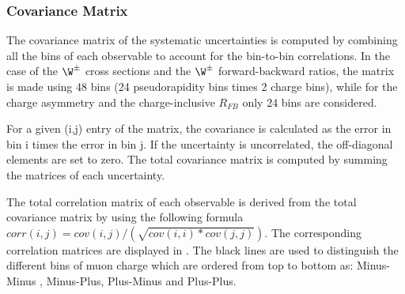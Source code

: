 






\clearpage
\subsubsection{Covariance Matrix}\label{sec:WBoson_Analysis_CovarianceMatrix}

The covariance matrix of the systematic uncertainties is computed by combining all the bins of each observable to account for the bin-to-bin correlations. In the case of the $\W^{\pm}$ cross sections and the $\W^{\pm}$ forward-backward ratios, the matrix is made using 48 bins (24 pseudorapidity bins times 2 charge bins), while for the charge asymmetry and the charge-inclusive $R_{FB}$ only 24 bins are considered.

For a given (i,j) entry of the matrix, the covariance is calculated as the error in bin i times the error in bin j. If the uncertainty is uncorrelated, the off-diagonal elements are set to zero. The total covariance matrix is computed by summing the matrices of each uncertainty.

The total correlation matrix of each observable is derived from the total covariance matrix by using the following formula $corr(i,j) = cov(i,j)/(\sqrt{cov(i,i)*cov(j,j)})$. The corresponding correlation matrices are displayed in . The black lines are used to distinguish the different bins of muon charge which are ordered from top to bottom as: Minus-Minus , Minus-Plus, Plus-Minus and Plus-Plus.


